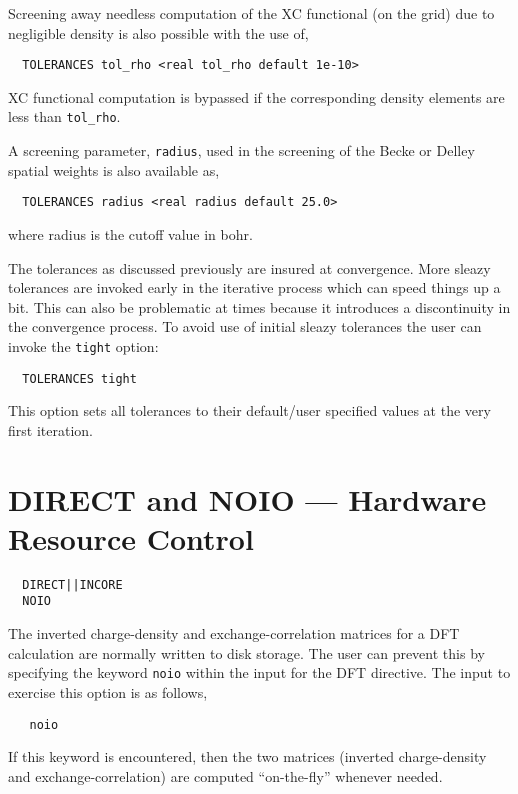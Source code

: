 
Screening away needless computation of the XC functional (on the grid)
due to negligible density is also possible with the use of,
\begin{verbatim}
  TOLERANCES tol_rho <real tol_rho default 1e-10>
\end{verbatim}
XC functional computation is bypassed if the corresponding density
elements are less than \verb+tol_rho+.

A screening parameter, \verb+radius+, used in the screening of the
Becke or Delley spatial weights is also available as,
\begin{verbatim}
  TOLERANCES radius <real radius default 25.0>
\end{verbatim}
where radius is the cutoff value in bohr.

The tolerances as discussed previously are insured at convergence.
More sleazy tolerances are invoked early in the iterative process
which can speed things up a bit.  This can also be problematic at
times because it introduces a discontinuity in the convergence
process.  To avoid use of initial sleazy tolerances the user can
invoke the \verb+tight+ option:

\begin{verbatim}
  TOLERANCES tight 
\end{verbatim}

This option sets all tolerances to their
default/user specified values at the very first iteration.


\section{DIRECT and NOIO --- Hardware Resource Control}
\begin{verbatim}
  DIRECT||INCORE
  NOIO
\end{verbatim}

\sloppy

The inverted charge-density and exchange-correlation matrices
for a DFT calculation are normally written to disk storage.  The user
can prevent this by specifying the keyword \verb+noio+ within the
input for the DFT directive.  The input to exercise this option is
as follows,
\begin{verbatim}
   noio
\end{verbatim}
If this keyword is encountered, then the two matrices (inverted
charge-density and exchange-correlation) are computed ``on-the-fly''
whenever needed.  

